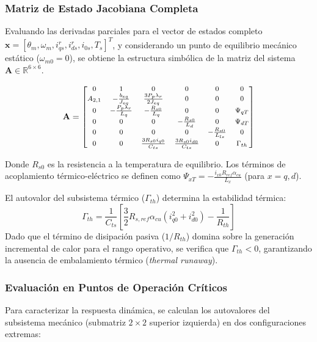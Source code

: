 \subsubsection{Matriz de Estado Jacobiana Completa}
Evaluando las derivadas parciales para el vector de estados completo $\mathbf{x} = [\theta_m, \omega_m, i_{qs}^r, i_{ds}^r, i_{0s}, T_s]^T$, y considerando un punto de equilibrio mecánico estático ($\omega_{m0}=0$), se obtiene la estructura simbólica de la matriz del sistema $\mathbf{A} \in \mathbb{R}^{6 \times 6}$.

\begingroup
\renewcommand{\arraystretch}{1.8}
\begin{equation} \footnotesize
\mathbf{A} =
\begin{bmatrix}
0 & 1 & 0 & 0 & 0 & 0 \\
A_{2,1} & -\frac{b_{eq}}{J_{eq}} & \frac{3 P_p \lambda_r}{2 J_{eq}} & 0 & 0 & 0 \\
0 & -\frac{P_p \lambda_r}{L_q} & -\frac{R_{s0}}{L_q} & 0 & 0 & \Psi_{qT} \\
0 & 0 & 0 & -\frac{R_{s0}}{L_d} & 0 & \Psi_{dT} \\
0 & 0 & 0 & 0 & -\frac{R_{s0}}{L_{ls}} & 0 \\
0 & 0 & \frac{3 R_{s0} i_{q0}}{C_{ts}} & \frac{3 R_{s0} i_{d0}}{C_{ts}} & 0 & \Gamma_{th}
\end{bmatrix}
\end{equation}
\endgroup

Donde $R_{s0}$ es la resistencia a la temperatura de equilibrio. Los términos de acoplamiento térmico-eléctrico se definen como $\Psi_{xT} = -\frac{i_{x0} R_{ref} \alpha_{cu}}{L_x}$ (para $x=q,d$).

El autovalor del subsistema térmico ($\Gamma_{th}$) determina la estabilidad térmica:
\begin{equation}
    \Gamma_{th} = \frac{1}{C_{ts}} \left[ \frac{3}{2} R_{s,ref} \alpha_{cu} (i_{q0}^2 + i_{d0}^2) - \frac{1}{R_{th}} \right]
\end{equation}
Dado que el término de disipación pasiva ($1/R_{th}$) domina sobre la generación incremental de calor para el rango operativo, se verifica que $\Gamma_{th} < 0$, garantizando la ausencia de embalamiento térmico (\textit{thermal runaway}).

\subsubsection{Evaluación en Puntos de Operación Críticos}
Para caracterizar la respuesta dinámica, se calculan los autovalores del subsistema mecánico (submatriz $2\times2$ superior izquierda) en dos configuraciones extremas:

